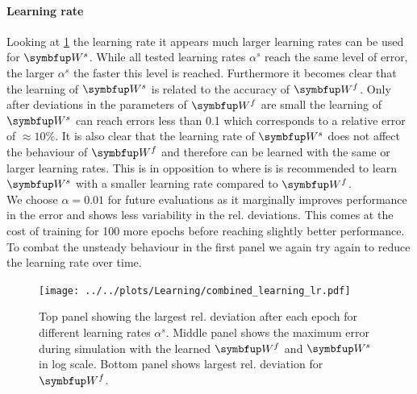 \paragraph{Learning rate}
Looking at \cref{fig:combined_learning_lr} the learning rate it appears much larger learning rates can be used for $\bmu{W}^s$. While all tested learning rates $\alpha^s$ reach the same level of error, the larger $\alpha^s$ the faster this level is reached. Furthermore it becomes clear that the learning of $\bmu{W}^s$ is related to the accuracy of $\bmu{W}^f$. Only after deviations in the parameters of $\bmu{W}^f$ are small the learning of $\bmu{W}^s$ can reach errors less than 0.1 which corresponds to a relative error of
$\approx 10\%$. It is also clear that the learning rate of $\bmu{W}^s$ does not affect the behaviour of $\bmu{W}^f$ and therefore can be learned with the same or larger learning rates. This is in opposition to \cite{bourdoukan_enforcing_2015} where is is recommended to learn $\bmu{W}^s$ with a smaller learning rate compared to $\bmu{W}^f$.\\
We choose $\alpha = 0.01$ for future evaluations as it marginally improves performance in the error and shows less variability in the rel. deviations. This comes at the cost of training for 100 more epochs before reaching slightly better performance.\\
To combat the unsteady behaviour in the first panel we again try again to reduce the learning rate over time.\\
\begin{figure}
	\centering
	\texttt{[image: ../../plots/Learning/combined\_learning\_lr.pdf]}
	\caption{Top panel showing the largest rel. deviation after each epoch for different learning rates $\alpha^s$. Middle panel shows the maximum error during simulation with the learned $\bmu{W}^f$ and $\bmu{W}^s$ in log scale. Bottom panel shows largest rel. deviation for $\bmu{W}^f$.}
	\label{fig:combined_learning_lr}
\end{figure}

